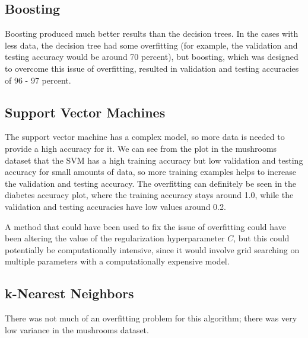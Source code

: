\documentclass[11pt]{article}
\begin{document}
        \subsection{Boosting}

        Boosting produced much better results than the decision trees. In the cases with less data, the decision
        tree had some overfitting (for example, the validation and testing accuracy would be around 70 percent),
        but boosting, which was designed to overcome this issue of overfitting, resulted in validation
        and testing accuracies of 96 - 97 percent.

        \subsection{Support Vector Machines}

        The support vector machine has a complex model, so more data is needed to provide a high accuracy for it. We can see from the plot in the mushrooms dataset
        that the SVM has a high training accuracy but low validation and testing accuracy for small amounts of data, so more training examples helps to increase the
        validation and testing accuracy. The overfitting can definitely be
        seen in the diabetes accuracy plot, where the training accuracy
        stays around 1.0, while the validation and testing accuracies have low values around 0.2.
        
        A method that could have been used to
        fix the issue of overfitting could have been altering the value of the regularization hyperparameter $C$,
        but this could potentially be computationally intensive, since it would involve grid
        searching on multiple parameters with a computationally expensive model.

        \subsection{k-Nearest Neighbors}

        There was not much of an overfitting problem for this algorithm; there was
        very low variance in the mushrooms dataset.

    
\end{document}
